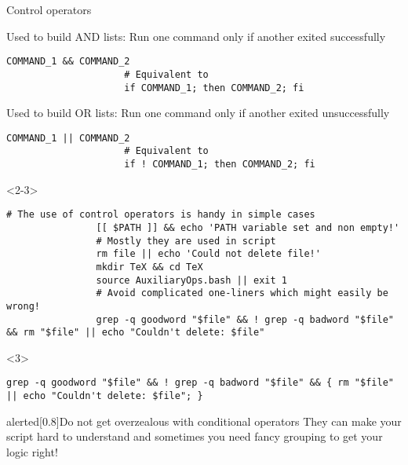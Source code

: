 \begin{frame}[fragile]{Control operators}
    \vspace{-3mm}
    \begin{overlayarea}{\textwidth}{0.625\textheight}
        \begin{description}[<only@1>][\texttt{\&\&}]
            \setlength{\itemsep}{5mm}
            \item[\texttt{\&\&}]
                 Used to build AND lists: Run one command only if another exited successfully
                 \begin{lstlisting}[style=MyBash, numbers=none, aboveskip=2mm]
                     COMMAND_1 && COMMAND_2
                     # Equivalent to
                     if COMMAND_1; then COMMAND_2; fi
                 \end{lstlisting}
            \item[\texttt{||}]
                 Used to build OR lists: Run one command only if another exited unsuccessfully
                 \begin{lstlisting}[style=MyBash, numbers=none, aboveskip=2mm]
                     COMMAND_1 || COMMAND_2
                     # Equivalent to
                     if ! COMMAND_1; then COMMAND_2; fi
                 \end{lstlisting}
        \end{description}
        \begin{onlyenv}<2-3>
            \begin{lstlisting}[style=MyBash, numbers=none, belowskip=-5mm]
                # The use of control operators is handy in simple cases
                [[ $PATH ]] && echo 'PATH variable set and non empty!'
                # Mostly they are used in script
                rm file || echo 'Could not delete file!'
                mkdir TeX && cd TeX
                source AuxiliaryOps.bash || exit 1
                # Avoid complicated one-liners which might easily be wrong!
                grep -q goodword "$file" && ! grep -q badword "$file" && rm "$file" || echo "Couldn't delete: $file"
            \end{lstlisting}
            \centerline{\small{}}
            \begin{uncoverenv}<3>
                \begin{lstlisting}[style=MyBash, numbers=none, aboveskip=3mm]
                    grep -q goodword "$file" && ! grep -q badword "$file" && { rm "$file" || echo "Couldn't delete: $file"; }
                \end{lstlisting}
            \end{uncoverenv}
        \end{onlyenv}
    \end{overlayarea}
    \begin{varblock}{alerted}[0.8\textwidth]{Do not get overzealous with conditional operators}
        They can make your script hard to understand and sometimes you need fancy grouping to get your logic right!
    \end{varblock}
\end{frame}
